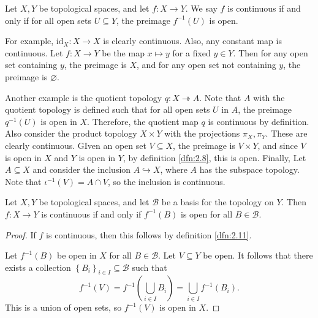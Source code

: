 \begin{definition}[Continuous]\label{dfn:2.11}
	Let $X,Y$ be topological spaces, and let $f : X \to Y$. We say $f$ is continuous if and only if for all open sets $U\subseteq Y$, the preimage $f^{-1} (U)$ is open.
\end{definition}
For example, $\mathrm{id}_X : X \to X$ is clearly continuous. Also, any constant map is continuous. Let $f : X \to Y$ be the map $x\mapsto y$ for a fixed $y\in Y$. Then for any open set containing $y$, the preimage is $X$, and for any open set not containing $y$, the preimage is $\varnothing $.

Another example is the quotient topology $q : X \twoheadrightarrow A$. Note that $A$ with the quotient topology is defined such that for all open sets $U$ in $A$, the preimage $q^{-1} (U)$ is open in $X$. Therefore, the quotient map $q$ is continuous by definition. Also consider the product topology $X\times Y$ with the projections $\pi_X,\pi_Y$. These are clearly continuous. GIven an open set $V\subseteq X$, the preimage is $V\times Y$, and since $V$ is open in $X$ and $Y$ is open in $Y$, by definition \ref{dfn:2.8}, this is open. Finally, Let $A\subseteq X$ and consider the inclusion $A\hookrightarrow X$, where $A$ has the subspace topology. Note that $\iota^{-1} (V)=A \cap V$, so the inclusion is continuous.

\begin{proposition}\label{prp:2.10}
	Let $X,Y$ be topological spaces, and let $\mathcal{B} $ be a basis for the topology on $Y$. Then $f : X \to Y$ is continuous if and only if $f^{-1} (B)$ is open for all $B\in \mathcal{B} $.
\end{proposition}
\begin{proof}
	If $f$ is continuous, then this follows by definition \ref{dfn:2.11}.

	Let $f^{-1} (B)$ be open in $X$ for all $B\in \mathcal{B} $. Let $V\subseteq Y$ be open. It follows that there exists a collection $\left\{ B_i \right\}_{i\in I} \subseteq \mathcal{B} $ such that
	\[
		f^{-1} (V)=f^{-1} \left( \bigcup_{i\in I} B_i \right) =\bigcup_{i\in I} f^{-1} (B_i)
	.\]
	This is a union of open sets, so $f^{-1} (V)$ is open in $X$.
\end{proof}

